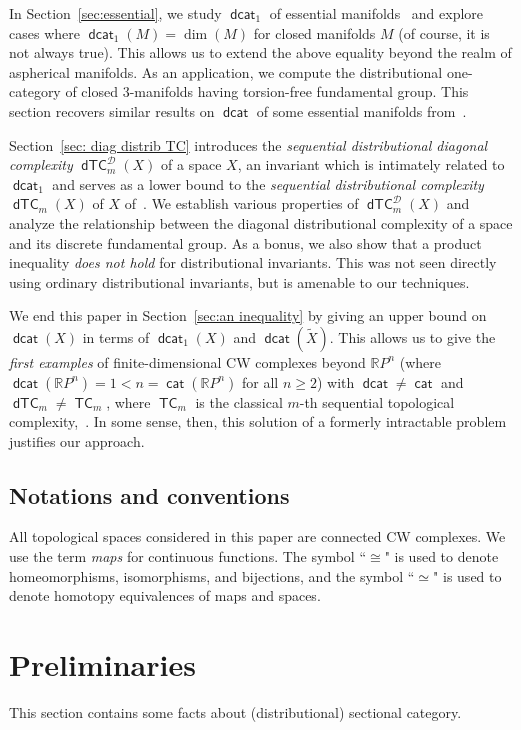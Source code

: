 \documentclass[amscd,amssymb,verbatim,11pt]{amsart}
\theoremstyle{plain}
\theoremstyle{definition}
\DeclareMathOperator{\cat}{{\mathsf{cat}}}
\DeclareMathOperator{\TC}{{\mathsf{TC}}}
\DeclareMathOperator{\dcat}{{\mathsf{dcat}}}
\DeclareMathOperator{\dTC}{{\mathsf{dTC}}}
\newcommand{\D}{\mathcal{D}}
\def\R{{\mathbb R}}
\def\rpn{{\R P^n}}
\begin{document}
In Section~\ref{sec:essential}, we study $\dcat_1$ of essential manifolds~\cite{Gr} and explore cases where $\dcat_1(M)=\dim(M)$ for closed manifolds $M$ (of course, it is not always true). This allows us to extend the above equality beyond the realm of aspherical manifolds. As an application, we compute the distributional one-category of closed $3$-manifolds having torsion-free fundamental group. This section recovers similar results on $\dcat$ of some essential manifolds from~\cite{Ja2}. 

Section~\ref{sec: diag distrib TC} introduces the \emph{sequential distributional diagonal complexity} $\dTC^\D_m(X)$ of a space $X$, an invariant which is intimately related to $\dcat_1$ and serves as a lower bound to the \emph{sequential distributional complexity} $\dTC_m(X)$ of $X$ of~\cite{Ja1}. We establish various properties of $\dTC^\D_m(X)$ and analyze the relationship between the diagonal distributional complexity of a space and its discrete fundamental group. As a bonus, we also show that a product inequality \emph{does not hold} for distributional invariants. This was not 
seen directly using ordinary distributional 
invariants, but is amenable to our techniques. 

We end this paper in Section~\ref{sec:an inequality} by giving an upper bound on $\dcat(X)$ in terms of $\dcat_1(X)$ and $\dcat(\widetilde X)$. This allows us to give the \emph{first examples} of finite-dimensional CW complexes beyond $\rpn$ (where $\dcat(\rpn)
= 1 < n = \cat(\rpn)$ for all $n\ge 2$) with $\dcat \not = \cat$ and $\dTC_m\ne \TC_m$, where $\TC_m$ is the classical $m$-th sequential topological complexity,~\cite{Fa,Ru2}. In some sense, then, this solution of a formerly intractable problem justifies our approach. 

\subsection*{Notations and conventions} All topological spaces considered in this paper are connected CW complexes. We use the term \emph{maps} for continuous functions. The symbol ``$\cong$" is used to denote homeomorphisms, isomorphisms, and bijections, and the symbol ``$\simeq$" is used to denote homotopy equivalences of maps and spaces. 

\section{Preliminaries}\label{sec:prelim}
This section contains some facts about (distributional) sectional category.
\end{document}
